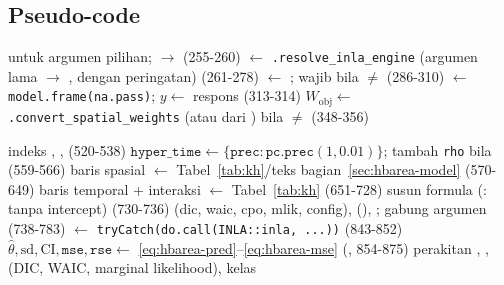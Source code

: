 \subsection{Pseudo-code}\label{sec:hbarea-algo}

\begin{algorithm}[htbp]
\caption{\texttt{hb\_area} --- alur sebenarnya (\texttt{R/hb\_area.R:231-469}, \texttt{.fit\_inla\_area:473-908})}
\label{alg:hbarea}
 untuk argumen pilihan;  $\to$  (255-260)\;
 $\leftarrow$ \texttt{.resolve\_inla\_engine} (argumen lama $\to$ , dengan peringatan) (261-278)\;
 $\leftarrow$ ;  wajib bila
   $\ne$  (286-310)\;
 $\leftarrow$ \texttt{model.frame(na.pass)};\quad
  $y\leftarrow$ respons (313-314)\;
\;
$W_{\text{obj}}\leftarrow$ \texttt{.convert\_spatial\_weights} (atau dari ) bila
   $\ne$  (348-356)\;
\;
\caption*{}
indeks , ,  (520-538)\;
$\texttt{hyper\_time}\leftarrow\{\texttt{prec}: \texttt{pc.prec}(1,0.01)\}$; tambah
  \texttt{rho} bila  (559-566)\;
baris spasial $\leftarrow$ Tabel~\ref{tab:kh}/teks bagian~\ref{sec:hbarea-model} (570-649)\;
baris temporal + interaksi $\leftarrow$ Tabel~\ref{tab:kh} (651-728)\;
susun formula  (: tanpa intercept) (730-736)\;
 (dic, waic, cpo, mlik, config), 
  (), ; gabung argumen  (738-783)\;
\;
 $\leftarrow$ \texttt{tryCatch(do.call(INLA::inla, ...))} (843-852)\;
$\hat\theta,\mathrm{sd},\mathrm{CI},\texttt{mse},\texttt{rse}\leftarrow$
  \eqref{eq:hbarea-pred}--\eqref{eq:hbarea-mse} (, 854-875)\;
perakitan , , 
  (DIC, WAIC, marginal likelihood), kelas \;
\end{algorithm}

